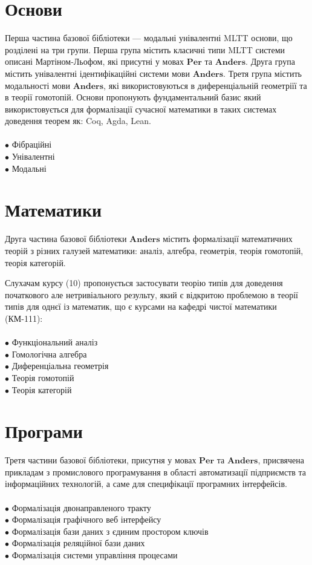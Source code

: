 \documentclass{article}
\theoremstyle{definition}
\begin{document}
\newpage
\section*{Основи}

Перша частина базової бібліотеки --- модальні унівалентні MLTT основи,
що розділені на три групи. Перша група містить класичні типи MLTT
системи описані Мартіном-Льофом, які присутні у мовах $\mathbf{Per}$
та $\mathbf{Anders}$. Друга група містить унівалентні ідентифікаційні
системи мови $\mathbf{Anders}$. Третя група містить модальності мови
$\mathbf{Anders}$, які використовуються в диференціальній геометріїї
та в теорії гомотопій. Основи пропонують фундаментальний базис який
використовується для формалізації сучасної математики в таких системах
доведення теорем як: Coq, Agda, Lean.
\\
\\
\noindent
$\bullet$ Фібраційні \\
$\bullet$ Унівалентні \\
$\bullet$ Модальні

\section*{Математики}

Друга частина базової бібліотеки $\mathbf{Anders}$ містить формалізації математичних
теорій з різних галузей математики: аналіз, алгебра, геометрія,
теорія гомотопій, теорія категорій.

Слухачам курсу (10) пропонується застосувати теорію типів для
доведення початкового але нетривіального результу, який є
відкритою проблемою в теорії типів для однєї із математик,
що є курсами на кафедрі чистої математики (КМ-111):\\
\\
\noindent
$\bullet$ Функціональний аналіз \\
$\bullet$ Гомологічна алгебра \\
$\bullet$ Диференціальна геометрія \\
$\bullet$ Теорія гомотопій \\
$\bullet$ Теорія категорій \\

\section*{Програми}

Третя частини базової бібліотеки, присутня у мовах $\mathbf{Per}$ та $\mathbf{Anders}$,
присвячена прикладам з промислового програмування в області автоматизації
підприємств та інформаційних технологій, а саме для специфікації програмних інтерфейсів.
\\
\\
\noindent $\bullet$ Формалізація двонаправленого тракту \\
$\bullet$ Формалізація графічного веб інтерфейсу \\
$\bullet$ Формалізація бази даних з єдиним простором ключів \\
$\bullet$ Формалізація реляційної бази даних \\
$\bullet$ Формалізація системи управління процесами \\
\end{document}
